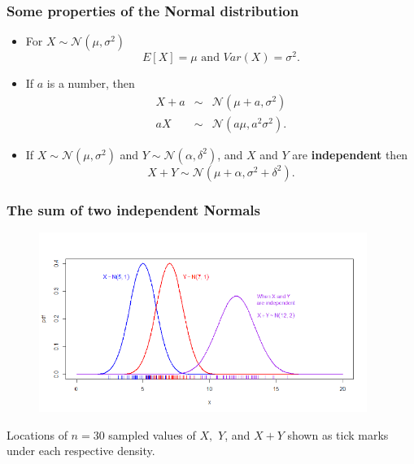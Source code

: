 \documentclass[notes=show,smaller,handout]{beamer}
\newcommand{\N}{\mathcal{N}}
\newenvironment{stepitemize}{\begin{itemize}[<+->]}{\end{itemize} }
\begin{document}
\begin{frame}%

\frametitle{Some properties of the Normal distribution}

\begin{stepitemize}
\item For $X\sim \N\left( \mu ,\sigma ^{2}\right) $ 
\begin{equation*}
E\left[ X\right] =\mu \text{ and }Var\left( X\right) =\sigma ^{2}.
\end{equation*}

\item If $a$ is a number, then 
\begin{eqnarray*}
X+a &\sim &\N\left( \mu +a,\sigma ^{2}\right) \\
aX &\sim &\N\left( a\mu ,a^{2}\sigma ^{2}\right).
\end{eqnarray*}

\item If $X\sim \N\left( \mu ,\sigma ^{2}\right) $ and $Y\sim \N\left( \alpha
,\delta ^{2}\right) $, and $X$ and $Y$ are \textbf{independent} then%
\begin{equation*}
X+Y\sim \N\left( \mu +\alpha ,\sigma ^{2}+\delta ^{2}\right).
\end{equation*}

\end{stepitemize}

\end{frame}%

\begin{frame}%

\frametitle{The sum of two independent Normals}


\begin{figure}[ptb]\centering
\includegraphics[width=0.95\textwidth,height=0.7\textheight]{sum_of_two_independent_normals_with_rug__1.pdf}%
\end{figure}


Locations of $n=30$ sampled values of $X,$ $Y$, and $X+Y$ shown as tick marks under each respective density.

\end{frame}%
\end{document}
